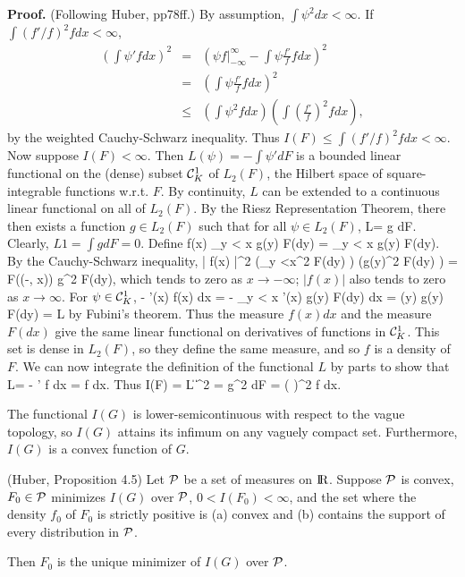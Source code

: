 \noindent
{\bf Proof.} (Following Huber, pp78ff.)
By assumption, $\int \psi^2 dx < \infty$.
If   $\int (f'/f)^2 f dx < \infty$,
\begin{eqnarray}
    \left ( \int \psi' f dx \right )^2 & = &
    \left (\psi f |_{-\infty}^\infty - \int \psi \frac{f'}{f} f dx \right )^2
    \nonumber \\
    &=& \left ( \int \psi \frac{f'}{f} f dx \right )^2
    \nonumber \\
    &\le & \left ( \int \psi^2 f dx\right ) \left ( \int  \left ( \frac{f'}{f}\right )^2
        f dx \right ) ,
\end{eqnarray}
by the weighted Cauchy-Schwarz inequality.
Thus $I(F) \le \int (f'/f)^2 f dx < \infty$.
Now suppose $I(F) < \infty$.
Then  $L(\psi)  = -\int \psi' dF$ is a bounded
linear functional on the (dense) subset ${\cal C}_K^1$ of $L_2(F)$, the Hilbert
space of square-integrable functions w.r.t. $F$.
By continuity, $L$ can be extended to a continuous linear functional on all
of $L_2(F)$.  By the Riesz Representation Theorem, there then exists a function
$g \in L_2(F)$ such that for all $\psi \in L_2(F)$,
\beq
    L\psi = \int \psi g dF.
\eeq
Clearly, $L1 = \int g dF = 0$.
Define
\beq
f(x) \equiv \int_{y < x} g(y) F(dy) = _{y < x} g(y) F(dy).
\eeq
By the Cauchy-Schwarz inequality,
\beq
    | f(x) |^2 \le (_{y <x}^2 F(dy) ) (\int g(y)^2 F(dy) )  =
    F((-\infty, x)) \int g^2 F(dy),
\eeq
which tends to zero as $x \rightarrow - \infty$;
$|f(x)|$ also tends to zero as $x \rightarrow \infty$.
For $\psi \in {\cal C}_K^1$,
\beq
    - \int \psi'(x) f(x) dx = - \int_{y < x} \int \psi'(x) g(y) F(dy) dx =
    \int \psi(y) g(y) F(dy) = L\psi
\eeq
by Fubini's theorem.
Thus the measure $f(x) dx$   and the measure $F(dx)$ give the same linear functional
on derivatives of functions in ${\cal C}_K^1$. This set is dense in $L_2(F)$, so
they define the same measure, and so $f$ is a density of $F$.
We can now integrate the definition of the functional $L$ by parts to show that
\beq
    L\psi = - \int \psi' f dx = \int \psi {} f dx.
\eeq
Thus
\beq
    I(F) = \| L \|^2 = \int g^2 dF = \int \left (  \right )^2 f dx.
\eeq

The functional $I(G)$ is lower-semicontinuous with respect to the vague topology,
so $I(G)$ attains its infimum on any vaguely compact set.
Furthermore, $I(G)$ is a convex function of $G$.

\begin{Theorem}
(Huber, Proposition 4.5)
Let ${\cal P}$ be a set of measures on $\hbox{I\kern-.17em\hbox{R}}$.
Suppose ${\cal P}$ is convex, $F_0 \in {\cal P}$ minimizes $I(G)$ over ${\cal P}$,
$0 < I(F_0) < \infty$, and the set where the density $f_0$ of $F_0$ is strictly positive
is (a) convex and (b) contains the support of every distribution in ${\cal P}$.

Then $F_0$ is the unique minimizer of $I(G)$ over ${\cal P}$.
\end{Theorem}

